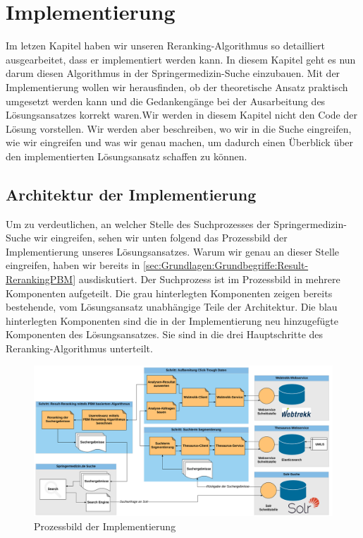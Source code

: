 %
\chapter{Implementierung}
\label{sec:Implementierung}

Im letzen Kapitel haben wir unseren Reranking-Algorithmus so detailliert ausgearbeitet, dass er implementiert werden kann. In diesem Kapitel geht es nun darum diesen Algorithmus in der Springermedizin-Suche einzubauen. Mit der Implementierung wollen wir herausfinden, ob der theoretische Ansatz praktisch umgesetzt werden kann und die Gedankengänge bei der Ausarbeitung des Lösungsansatzes korrekt waren.Wir werden in diesem Kapitel nicht den Code der Lösung vorstellen. Wir werden aber beschreiben, wo wir in die Suche eingreifen, wie wir eingreifen und was wir genau machen, um dadurch einen Überblick über den implementierten Lösungsansatz schaffen zu können.

\section{Architektur der Implementierung}
\label{sec:Implementierung:Architektur}

Um zu verdeutlichen, an welcher Stelle des Suchprozesses der Springermedizin-Suche wir eingreifen, sehen wir unten folgend das Prozessbild der Implementierung unseres Lösungsansatzes. Warum wir genau an dieser Stelle eingreifen, haben wir bereits in \ref{sec:Grundlagen:Grundbegriffe:Result-RerankingPBM} ausdiskutiert. Der Suchprozess ist im Prozessbild in mehrere Komponenten aufgeteilt. Die grau hinterlegten Komponenten zeigen bereits bestehende, vom Lösungsansatz unabhängige Teile der Architektur. Die blau hinterlegten Komponenten sind die in der Implementierung neu hinzugefügte Komponenten des Lösungsansatzes. Sie sind in die drei Hauptschritte des Reranking-Algorithmus unterteilt.

\begin{figure}[H]
\centering
\vspace{-1em}
\caption[Prozessbild der Implementierung]{Prozessbild der Implementierung}
\label{fig:ProzessbildImplementierung}
\includegraphics[width=\linewidth]{gfx/ImplementierungProzessbild}
\vspace{-3em}
\end{figure}


